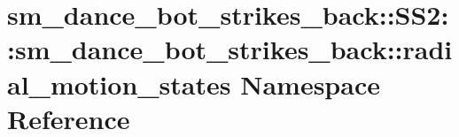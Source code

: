 \hypertarget{namespacesm__dance__bot__strikes__back_1_1SS2_1_1sm__dance__bot__strikes__back_1_1radial__motion__states}{}\section{sm\+\_\+dance\+\_\+bot\+\_\+strikes\+\_\+back\+:\+:S\+S2\+:\+:sm\+\_\+dance\+\_\+bot\+\_\+strikes\+\_\+back\+:\+:radial\+\_\+motion\+\_\+states Namespace Reference}
\label{namespacesm__dance__bot__strikes__back_1_1SS2_1_1sm__dance__bot__strikes__back_1_1radial__motion__states}

